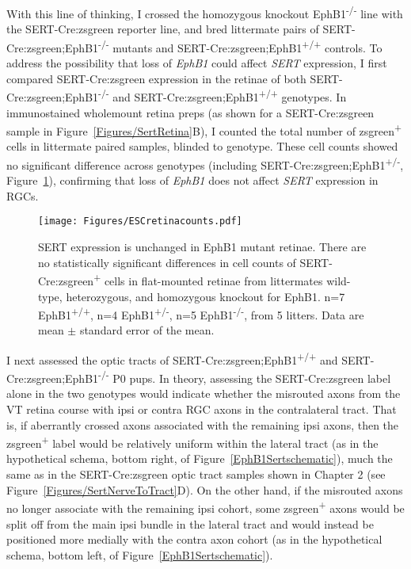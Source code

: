 With this line of thinking, I crossed the homozygous knockout EphB1\textsuperscript{-/-} line with the SERT-Cre:zsgreen reporter line, and bred littermate pairs of SERT-Cre:zsgreen;EphB1\textsuperscript{-/-} mutants and SERT-Cre:zsgreen;EphB1\textsuperscript{+/+} controls.
To address the possibility that loss of \emph{EphB1} could affect \emph{SERT} expression, I first compared SERT-Cre:zsgreen expression in the retinae of both SERT-Cre:zsgreen;EphB1\textsuperscript{-/-} and SERT-Cre:zsgreen;EphB1\textsuperscript{+/+} genotypes.
In immunostained wholemount retina preps (as shown for a SERT-Cre:zsgreen sample in Figure~\ref{Figures/SertRetina}B), I counted the total number of zsgreen\textsuperscript{+} cells in littermate paired samples, blinded to genotype.
These cell counts showed no significant difference across genotypes (including SERT-Cre:zsgreen;EphB1\textsuperscript{+/-}, Figure~\ref{ESCretinacounts}), confirming that loss of \emph{EphB1} does not affect \emph{SERT} expression in RGCs.
\begin{figure}[hbtp]
    \begin{center}
        \texttt{[image: Figures/ESCretinacounts.pdf]}
        \caption[SERT expression is unchanged in EphB1 mutant retinae.]
        {SERT expression is unchanged in EphB1 mutant retinae.
        There are no statistically significant differences in cell counts of SERT-Cre:zsgreen\textsuperscript{+} cells in flat-mounted retinae from littermates wild-type, heterozygous, and homozygous knockout for EphB1.
        n=7 EphB1\textsuperscript{+/+}, n=4 EphB1\textsuperscript{+/-}, n=5 EphB1\textsuperscript{-/-}, from 5 litters.
        Data are mean $\pm$ standard error of the mean.
        }
        \label{ESCretinacounts}
    \end{center}
\end{figure}

I next assessed the optic tracts of SERT-Cre:zsgreen;EphB1\textsuperscript{+/+} and SERT-Cre:zsgreen;EphB1\textsuperscript{-/-} P0 pups.
In theory, assessing the SERT-Cre:zsgreen label alone in the two genotypes would indicate whether the misrouted axons from the VT retina course with ipsi or contra RGC axons in the contralateral tract.
That is, if aberrantly crossed axons associated with the remaining ipsi axons, then the zsgreen\textsuperscript{+} label would be relatively uniform within the lateral tract (as in the hypothetical schema, bottom right, of Figure~\ref{EphB1Sertschematic}), much the same as in the SERT-Cre:zsgreen optic tract samples shown in Chapter 2 (see Figure~\ref{Figures/SertNerveToTract}D).
On the other hand, if the misrouted axons no longer associate with the remaining ipsi cohort, some zsgreen\textsuperscript{+} axons would be split off from the main ipsi bundle in the lateral tract and would instead be positioned more medially with the contra axon cohort (as in the hypothetical schema, bottom left, of Figure~\ref{EphB1Sertschematic}).

